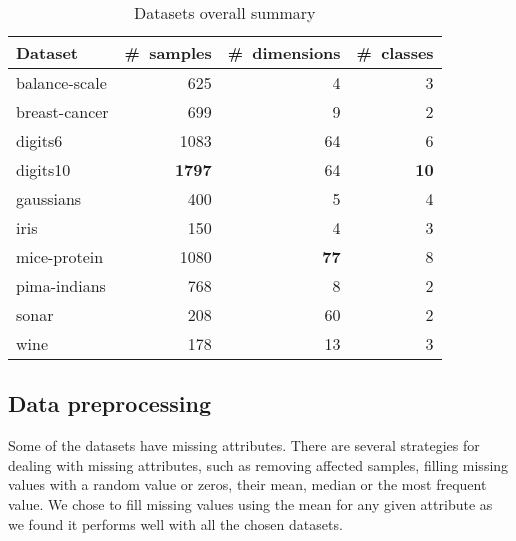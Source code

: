 \begin{table}[ht] \centering
\begin{tabular}{lrrr}
\hline
Dataset & \#~samples & \#~dimensions & \#~classes \\
\hline
balance-scale           & 625   & 4    & 3  \\
breast-cancer           & 699   & 9    & 2  \\
digits6                 & 1083  & 64   & 6  \\
digits10                & \textbf{1797}  & 64  & \textbf{10} \\
gaussians               & 400   & 5   & 4  \\
iris                    & 150   & 4    & 3  \\
mice-protein            & 1080  & \textbf{77}   & 8  \\
pima-indians            & 768   & 8    & 2  \\
sonar                   & 208   & 60   & 2  \\
wine                    & 178   & 13   & 3  \\
\hline
\end{tabular}
\caption{Datasets overall summary} \label{tab:datasets}
\end{table}

\subsection{Data preprocessing} \label{chap:exp:preprocessing}
Some of the datasets have missing attributes. There are several strategies for dealing with missing attributes, such as removing affected samples, filling missing values with a random value or zeros, their mean, median or the most frequent value. We chose to fill missing values using the mean for any given attribute as we found it performs well with all the chosen datasets.

